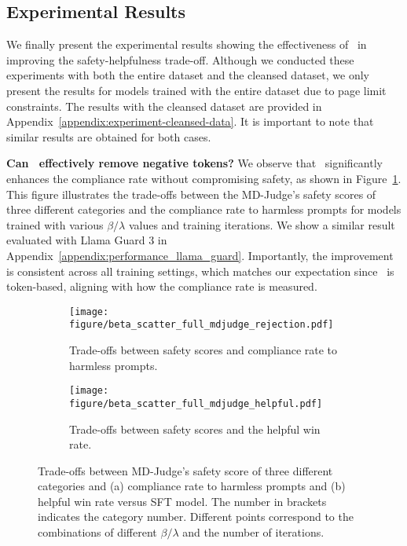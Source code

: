 \subsection{Experimental Results}
We finally present the experimental results showing the effectiveness of \algoshort~in improving the safety-helpfulness trade-off.
Although we conducted these experiments with both the entire dataset and the cleansed dataset, we only present the results for models trained with the entire dataset due to page limit constraints. The results with the cleansed dataset are provided in Appendix~\ref{appendix:experiment-cleansed-data}. It is important to note that similar results are obtained for both cases.


\textbf{Can \algoshort~effectively remove negative tokens?} We observe that \algoshort~significantly enhances the compliance rate without compromising safety, as shown in Figure~\ref{fig:trade-offs-compliance}. This figure illustrates the trade-offs between the MD-Judge's safety scores of three different categories and the compliance rate to harmless prompts for models trained with various $\beta/\lambda$ values and training iterations. We show a similar result evaluated with Llama Guard 3 in Appendix~\ref{appendix:performance_llama_guard}. Importantly, the improvement is consistent across all training settings, which matches our expectation since \algoshort~is token-based, aligning with how the compliance rate is measured.

\begin{figure*}[t]
    \begin{subfigure}{\textwidth}
    \centering
    \texttt{[image: figure/beta\_scatter\_full\_mdjudge\_rejection.pdf]}
    \caption{Trade-offs between safety scores and compliance rate to harmless prompts.}
    \vspace{10pt}
    \label{fig:trade-offs-compliance}
    \end{subfigure}
    \begin{subfigure}{\textwidth}
    \centering
    \texttt{[image: figure/beta\_scatter\_full\_mdjudge\_helpful.pdf]}
    \caption{Trade-offs between safety scores and the helpful win rate.}
    \label{fig:trade-offs-helpfulness}
    \end{subfigure}
    \caption{Trade-offs between MD-Judge's safety score of three different categories and (a) compliance rate to harmless prompts and (b) helpful win rate versus SFT model. The number in brackets indicates the category number. Different points correspond to the combinations of different $\beta/\lambda$ and the number of iterations.}
\end{figure*}

